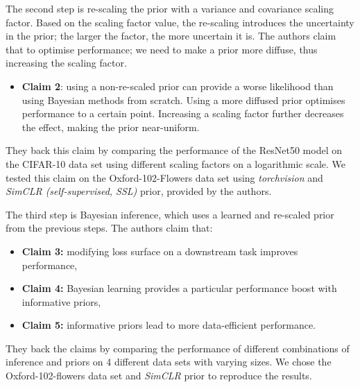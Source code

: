 The second step is re-scaling the prior with a variance and covariance scaling factor. Based on the scaling factor value, the re-scaling introduces the uncertainty in the prior; the larger the factor, the more uncertain it is. The authors claim that to optimise performance; we need to make a prior more diffuse, thus increasing the scaling factor.
\begin{itemize}
    \item \textbf{Claim 2}: using a non-re-scaled prior can provide a worse likelihood than using Bayesian methods from scratch. Using a more diffused prior optimises performance to a certain point. Increasing a scaling factor further decreases the effect, making the prior near-uniform.
\end{itemize}
They back this claim by comparing the performance of the ResNet50 model on the CIFAR-10 data set using different scaling factors on a logarithmic scale. We tested this claim on the Oxford-102-Flowers data set using \textit{torchvision} and \textit{SimCLR (self-supervised, SSL)} prior, provided by the authors.

The third step is Bayesian inference, which uses a learned and re-scaled prior from the previous steps.
The authors claim that:
\begin{itemize}
    \item \textbf{Claim 3:} modifying loss surface on a downstream task improves performance,
    \item \textbf{Claim 4:} Bayesian learning provides a particular performance boost with informative priors,
    \item \textbf{Claim 5:} informative priors lead to more data-efficient performance.
\end{itemize}
They back the claims by comparing the performance of different combinations of inference and priors on 4 different data sets with varying sizes. We chose the Oxford-102-flowers data set and \textit{SimCLR} prior to reproduce the results.



